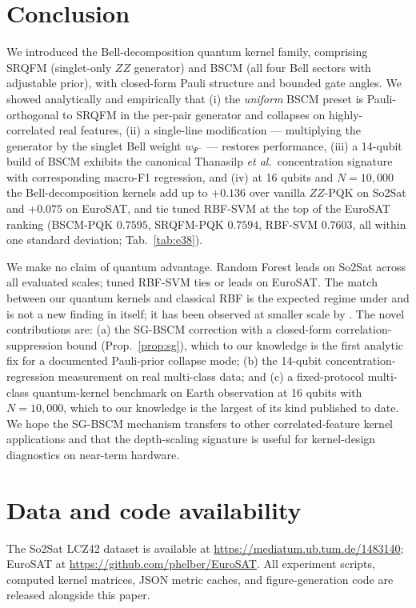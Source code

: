 \documentclass[pdflatex,sn-mathphys-num]{sn-jnl}
\theoremstyle{thmstyleone}
\theoremstyle{thmstyletwo}
\theoremstyle{thmstylethree}
\begin{document}
\section{Conclusion}\label{sec:conclusion}

We introduced the Bell-decomposition quantum kernel family, comprising
SRQFM (singlet-only $ZZ$ generator) and BSCM (all four Bell sectors with
adjustable prior), with closed-form Pauli structure and bounded gate
angles. We showed analytically and empirically that (i) the
\emph{uniform} BSCM preset is Pauli-orthogonal to SRQFM in the per-pair
generator and collapses on highly-correlated real features, (ii) a
single-line modification --- multiplying the generator by the singlet
Bell weight $w_{\Psi^-}$ --- restores performance, (iii) a 14-qubit
build of BSCM exhibits the canonical Thanasilp \emph{et al.}\
concentration signature with corresponding macro-F1 regression, and
(iv) at 16 qubits and $N=10{,}000$ the Bell-decomposition kernels
add up to $+0.136$ over vanilla $ZZ$-PQK on So2Sat and $+0.075$ on
EuroSAT, and tie tuned RBF-SVM at the top of the EuroSAT ranking
(BSCM-PQK $0.7595$, SRQFM-PQK $0.7594$, RBF-SVM $0.7603$, all within
one standard deviation; Tab.~\ref{tab:e38}).

We make no claim of quantum advantage. Random Forest leads on So2Sat
across all evaluated scales; tuned RBF-SVM ties or leads on EuroSAT.
The match between our quantum kernels and classical RBF is the
expected regime under \cite{heyraud2022,slattery2025} and is not a
new finding in itself; it has been observed at smaller scale by
\cite{schnabel2025,bowles2024,rodriguez2025}. The novel contributions
are: (a) the SG-BSCM correction with a closed-form
correlation-suppression bound (Prop.~\ref{prop:sg}), which to our
knowledge is the first analytic fix for a documented Pauli-prior
collapse mode; (b) the 14-qubit concentration-regression measurement
on real multi-class data; and (c) a fixed-protocol multi-class
quantum-kernel benchmark on Earth observation at 16 qubits with
$N=10{,}000$, which to our knowledge is the largest of its kind
published to date. We hope the SG-BSCM mechanism transfers to other
correlated-feature kernel applications and that the depth-scaling
signature is useful for kernel-design diagnostics on near-term
hardware.

\section*{Data and code availability}
The So2Sat LCZ42 dataset is available at
\url{https://mediatum.ub.tum.de/1483140}; EuroSAT at
\url{https://github.com/phelber/EuroSAT}.
All experiment scripts, computed kernel matrices, JSON metric caches,
and figure-generation code are released alongside this paper.
\end{document}
